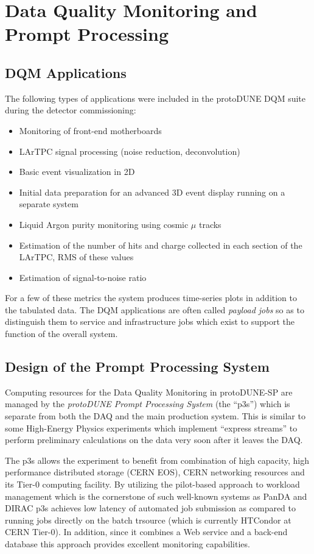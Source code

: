 \documentclass{webofc}
\newcommand{\pd}{protoDUNE\xspace}
\begin{document}
\section{Data Quality Monitoring and Prompt Processing}
\subsection{DQM Applications}
The following types of applications were included in the \pd DQM suite during the detector
commissioning:
\begin{itemize}
\item Monitoring of front-end motherboards
\item LArTPC signal processing (noise reduction, deconvolution)
\item Basic event visualization in 2D
\item Initial data preparation for an advanced 3D event display running on a separate system
\item Liquid Argon purity monitoring using cosmic $\mu$ tracks
\item Estimation of the number of hits and charge collected in each section of the LArTPC, RMS of these values
\item Estimation of signal-to-noise ratio
\end{itemize}

\noindent For a few of these metrics the system produces time-series plots in addition to the tabulated data.
The DQM applications are often called \textit{payload jobs} so as to distinguish
them to service and infrastructure jobs which exist to support the function of the overall system.


\subsection{Design of the Prompt Processing System}

Computing resources for the Data Quality Monitoring in \pd-SP are managed by
the  \textit{\pd Prompt Processing System} (the ``p3s'')
which is separate from both the DAQ and the main production system. This is similar to some High-Energy Physics
experiments which implement ``express streams'' to perform preliminary calculations on the data very soon
after it leaves the DAQ.

The  p3s allows the experiment to benefit from combination of high capacity, high
performance distributed storage (CERN EOS), CERN networking resources and its Tier-0 computing facility.
By utilizing the pilot-based approach \cite{eps} to workload management which is the cornerstone of such well-known
systems as PanDA and DIRAC \cite{panda,dirac} p3s achieves low latency of automated job submission
as compared to running jobs directly on the batch trsource (which is currently HTCondor at CERN Tier-0).
In addition, since it combines a Web service and a back-end database this approach provides excellent
monitoring capabilities.
\end{document}
